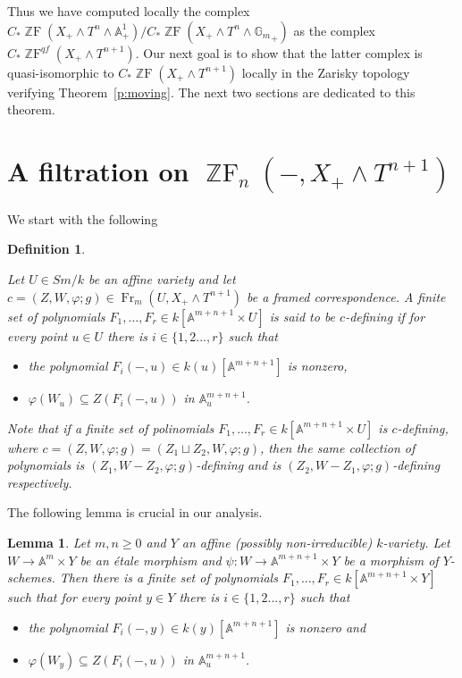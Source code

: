 \documentclass[a4paper,11pt,reqno]{amsart}
\newtheorem{lemma}[theorem]{Lemma}
\newtheorem{definition}[theorem]{Definition}
\begin{document}
Thus we have computed locally the complex $C_*{\operatorname{\mathbb{Z}F}}(X_+\wedge T^n
\wedge {\mathbb{A}}^1_+)/C_*{\operatorname{\mathbb{Z}F}}(X_+\wedge T^n \wedge {{\mathbb{G}_m}}_+)$ as the complex
$C_*{\operatorname{\mathbb{Z}F}}^{qf}(X_+\wedge T^{n+1})$. Our next goal is to show that the
latter complex is quasi-isomorphic to $C_*{\operatorname{\mathbb{Z}F}}(X_+\wedge T^{n+1})$
locally in the Zarisky topology verifying Theorem~\ref{p:moving}.
The next two sections are dedicated to this theorem.

\section{A filtration on ${\operatorname{\mathbb{Z}F}}_n(-,X_+\wedge T^{n+1})$}

We start with the following

\begin{definition}\label{d:defining_set}{\rm
Let $U\in Sm/k$ be an affine variety and let $c=(Z,W,{\varphi};g)\in
{\operatorname{Fr}}_m(U,X_+\wedge T^{n+1})$ be a framed correspondence. A finite set
of polynomials $F_1,\ldots, F_r \in k[{\mathbb{A}}^{m+n+1}\times U]$ is said
to be {\it $c$-defining\/} if for every point $u\in U$ there is
$i\in \{1,2...,r\}$ such that
\begin{itemize}
\item[$\diamond$] the polynomial $F_i(-,u) \in k(u)[{\mathbb{A}}^{m+n+1}]$ is
nonzero,
\item[$\diamond$] ${\varphi}(W_u)\subseteq Z(F_i(-,u))$ in
${\mathbb{A}}^{m+n+1}_u$.
\end{itemize}
Note that if a finite set of polinomials $F_1,\ldots, F_r \in
k[{\mathbb{A}}^{m+n+1}\times U]$ is $c$-defining, where
$c=(Z,W,{\varphi};g)=(Z_1\sqcup Z_2,W,{\varphi};g)$, then the same collection
of polynomials is $(Z_1,W-Z_2,{\varphi};g)$-defining and is
$(Z_2,W-Z_1,{\varphi};g)$-defining respectively.

}\end{definition}

The following lemma is crucial in our analysis.

\begin{lemma}
Let $m,n{\geqslant} 0$ and $Y$ an affine (possibly non-irreducible)
$k$-variety. Let $W\to {\mathbb{A}}^m\times Y$ be an \'{e}tale morphism and
$\psi: W\to {\mathbb{A}}^{m+n+1}\times Y$ be a morphism of $Y$-schemes. Then
there is a finite set of polynomials $F_1,\ldots, F_r \in
k[{\mathbb{A}}^{m+n+1}\times Y]$ such that for every point $y\in Y$ there is
$i\in \{1,2...,r\}$ such that
\begin{itemize}
\item[$\diamond$] the polynomial $F_i(-,y) \in k(y)[{\mathbb{A}}^{m+n+1}]$ is nonzero and
\item[$\diamond$] ${\varphi}(W_y)\subseteq Z(F_i(-,u))$ in ${\mathbb{A}}^{m+n+1}_u$.
\end{itemize}
\end{lemma}
\end{document}
